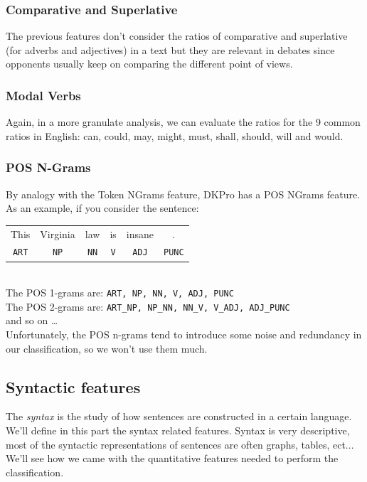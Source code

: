 \subsubsection{Comparative and Superlative}
The previous features don't consider the ratios of comparative and superlative (for adverbs and adjectives) in a text but they are relevant in debates since opponents usually keep on comparing the different point of views.

\subsubsection{Modal Verbs}
Again, in a more granulate analysis, we can evaluate the ratios for the 9 common ratios in English: can, could, may, might, must, shall, should, will and would.

\subsubsection{POS N-Grams}
By analogy with the Token NGrams feature, DKPro has a POS NGrams feature. As an example, if you consider the sentence:

\begin{table}[h]
\center
\begin{tabular}{cccccc}
This & Virginia & law & is & insane & .    \\
\texttt{ART}  & \texttt{NP}       & \texttt{NN}  & \texttt{V}  & \texttt{ADJ}    & \texttt{PUNC}
\end{tabular}
\end{table}\
\\
The POS 1-grams are: \texttt{ART, NP, NN, V, ADJ, PUNC}
\\
The POS 2-grams are: \texttt{ART\_NP, NP\_NN, NN\_V, V\_ADJ, ADJ\_PUNC}
\\
and so on \ldots
\\
Unfortunately, the POS n-grams tend to introduce some noise and redundancy in our classification, so we won't use them much.

\subsection{Syntactic features}
The \emph{syntax} is the study of how sentences are constructed in a certain language. We'll define in this part the syntax related features. Syntax is very descriptive, most of the syntactic representations of sentences are often graphs, tables, ect... We'll see how we came with the quantitative features needed to perform the classification.

